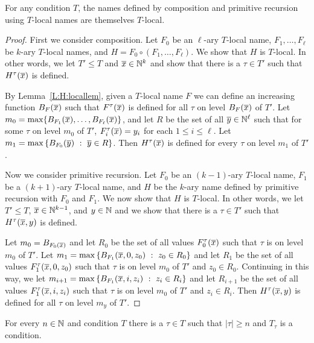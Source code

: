 \begin{prop}[$\RCAo$]\label{P:H:comp&pr}
For any condition $T$,
the names defined by composition and primitive recursion
using $T$-local names are themselves $T$-local.
\end{prop}
\begin{proof}
First we consider composition.
Let $F_0$ be an $\ell$-ary $T$-local name, $F_1,\ldots,F_\ell$ be $k$-ary $T$-local names,
and $H=F_0\circ(F_1,\ldots,F_\ell)$.
We show that $H$ is $T$-local.
In other words, we let $T'\leq T$ and $\overline{x}\in\mathbb{N}^k$
and show that there is a $\tau\in T'$ such that $H^\tau(\overline{x})$ is defined.

By Lemma~\ref{L:H:locallem}, given a $T$-local name $F$ we can define an increasing function
$B_F(\overline{x})$ such that $F^\tau(\overline{x})$ is defined for all $\tau$
on level $B_F(\overline{x})$ of $T'$.
Let $m_0=\max\{B_{F_1}(\overline{x}),\ldots,B_{F_\ell}(\overline{x})\}$, and
let $R$ be the set of all $\overline{y}\in\mathbb{N}^\ell$ such that
for some $\tau$ on level $m_0$ of $T'$, $F_i^\tau(\overline{x})=y_i$ for each $1\leq i\leq \ell$.
Let $m_1=\max\left\{B_{F_0}(\overline{y})\ :\ \overline{y}\in R\right\}$.
Then $H^\tau(\overline{x})$ is defined for every $\tau$ on level $m_1$ of $T'$.

Now we consider primitive recursion.
Let $F_0$ be an $(k-1)$-ary $T$-local name, $F_1$ be a $(k+1)$-ary $T$-local name,
and $H$ be the $k$-ary name defined by primitive recursion with $F_0$ and $F_1$.
We now show that $H$ is $T$-local.
In other words, we let $T'\leq T$, $\overline{x}\in\mathbb{N}^{k-1}$, and $y\in\mathbb{N}$
and we show that there is a $\tau\in T'$ such that $H^\tau(\overline{x},y)$ is defined.

Let $m_0=B_{F_0(\overline{x})}$ and let $R_0$ be the set of all
values $F_0^\tau(\overline{x})$ such that $\tau$ is on level $m_0$ of $T'$.
Let $m_1=\max\left\{B_{F_1}(\overline{x},0,z_0)\ :\ z_0\in R_0\right\}$ and let $R_1$ be the set of all
values $F_1^\tau(\overline{x},0,z_0)$ such that $\tau$ is on level $m_0$ of $T'$ and $z_0\in R_0$.
Continuing in this way, we let $m_{i+1}=\max\left\{B_{F_1}(\overline{x},i,z_i)\ :\ z_i\in R_i\right\}$
and let $R_{i+1}$ be the set of all
values $F_1^\tau(\overline{x},i,z_i)$ such that $\tau$ is on level $m_0$ of $T'$ and $z_i\in R_i$.
Then $H^\tau(\overline{x},y)$ is defined for all $\tau$ on level $m_y$ of $T'$.
\end{proof}

\begin{prop}[\RCAo]\label{P:H:almost persistent2}
For every $n\in\mathbb{N}$ and condition $T$ there is a $\tau\in T$ such that
$|\tau|\geq n$ and $T_\tau$ is a condition.
\end{prop}

